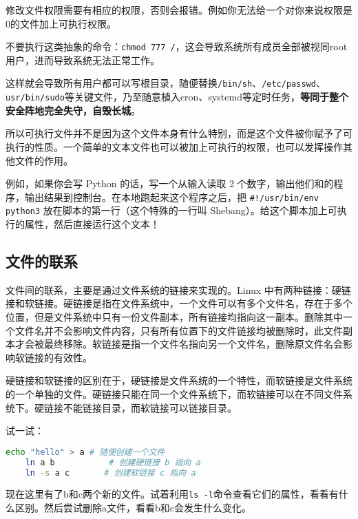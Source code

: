 \begin{tip}
  修改文件权限需要有相应的权限，否则会报错。例如你无法给一个对你来说权限是0的文件加上可执行权限。
\end{tip}

\begin{warning}
  不要执行这类抽象的命令：\texttt{chmod 777 /}，这会导致系统所有成员全部被视同root用户，进而导致系统无法正常工作。
  
  这样就会导致所有用户都可以写根目录，随便替换\texttt{/bin/sh}、\texttt{/etc/passwd}、\texttt{usr/bin/sudo}等关键文件，乃至随意植入cron、systemd等定时任务，\textbf{等同于整个安全阵地完全失守，自毁长城}。
\end{warning}

所以可执行文件并不是因为这个文件本身有什么特别，而是这个文件被你赋予了可执行的性质。一个简单的文本文件也可以被加上可执行的权限，也可以发挥操作其他文件的作用。

例如，如果你会写 Python 的话，写一个从输入读取 2 个数字，输出他们和的程序，输出结果到控制台。在本地跑起来这个程序之后，把 \texttt{\#!/usr/bin/env python3} 放在脚本的第一行（这个特殊的一行叫 Shebang）。给这个脚本加上可执行的属性，然后直接运行这个文本！

\subsection{文件的联系}

文件间的联系，主要是通过文件系统的链接来实现的。Linux 中有两种链接：硬链接和软链接。硬链接是指在文件系统中，一个文件可以有多个文件名，存在于多个位置，但是文件系统中只有一份文件副本，所有链接均指向这一副本。删除其中一个文件名并不会影响文件内容，只有所有位置下的文件链接均被删除时，此文件副本才会被最终移除。软链接是指一个文件名指向另一个文件名，删除原文件名会影响软链接的有效性。

硬链接和软链接的区别在于，硬链接是文件系统的一个特性，而软链接是文件系统的一个单独的文件。硬链接只能在同一个文件系统下，而软链接可以在不同文件系统下。硬链接不能链接目录，而软链接可以链接目录。

\begin{tip}
  试一试：
  \begin{lstlisting}[language=bash]
    echo "hello" > a # 随便创建一个文件
    ln a b           # 创建硬链接 b 指向 a
    ln -s a c       # 创建软链接 c 指向 a
  \end{lstlisting}
  现在这里有了b和c两个新的文件。试着利用\texttt{ls -l}命令查看它们的属性，看看有什么区别。然后尝试删除a文件，看看b和c会发生什么变化。
\end{tip}

